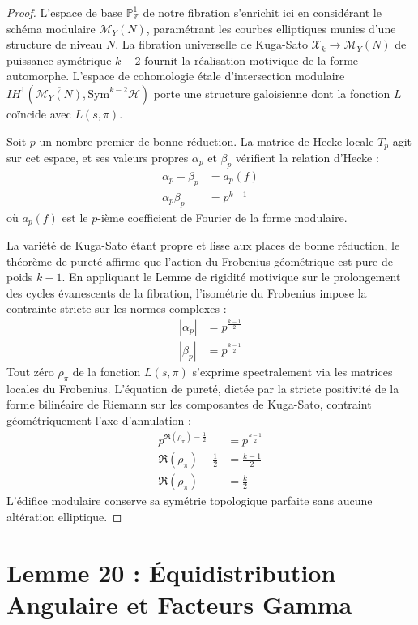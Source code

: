 \documentclass[
]{article}
\begin{document}
\begin{proof}
L'espace de base $\mathbb{P}^1_{\mathbb{Z}}$ de notre fibration s'enrichit ici en considérant le schéma modulaire $\mathcal{M}_Y(N)$, paramétrant les courbes elliptiques munies d'une structure de niveau $N$. La fibration universelle de Kuga-Sato $\mathcal{X}_k \to \mathcal{M}_Y(N)$ de puissance symétrique $k-2$ fournit la réalisation motivique de la forme automorphe.
L'espace de cohomologie étale d'intersection modulaire $IH^1(\overline{\mathcal{M}_Y(N)}, \mathrm{Sym}^{k-2}\mathcal{H})$ porte une structure galoisienne dont la fonction $L$ coïncide avec $L(s, \pi)$.

Soit $p$ un nombre premier de bonne réduction. La matrice de Hecke locale $T_p$ agit sur cet espace, et ses valeurs propres $\alpha_p$ et $\beta_p$ vérifient la relation d'Hecke :
\begin{align*}
\alpha_p + \beta_p &= a_p(f) \\
\alpha_p \beta_p &= p^{k-1}
\end{align*}
où $a_p(f)$ est le $p$-ième coefficient de Fourier de la forme modulaire.

La variété de Kuga-Sato étant propre et lisse aux places de bonne réduction, le théorème de pureté affirme que l'action du Frobenius géométrique est pure de poids $k-1$. En appliquant le Lemme de rigidité motivique sur le prolongement des cycles évanescents de la fibration, l'isométrie du Frobenius impose la contrainte stricte sur les normes complexes :
\begin{align*}
|\alpha_p| &= p^{\frac{k-1}{2}} \\
|\beta_p| &= p^{\frac{k-1}{2}}
\end{align*}
Tout zéro $\rho_{\pi}$ de la fonction $L(s, \pi)$ s'exprime spectralement via les matrices locales du Frobenius. L'équation de pureté, dictée par la stricte positivité de la forme bilinéaire de Riemann sur les composantes de Kuga-Sato, contraint géométriquement l'axe d'annulation :
\begin{align*}
p^{\Re(\rho_{\pi}) - \frac{1}{2}} &= p^{\frac{k-1}{2}} \\
\Re(\rho_{\pi}) - \frac{1}{2} &= \frac{k-1}{2} \\
\Re(\rho_{\pi}) &= \frac{k}{2}
\end{align*}
L'édifice modulaire conserve sa symétrie topologique parfaite sans aucune altération elliptique.
\end{proof}


\section{Lemme 20 : Équidistribution Angulaire et Facteurs Gamma}
\end{document}
